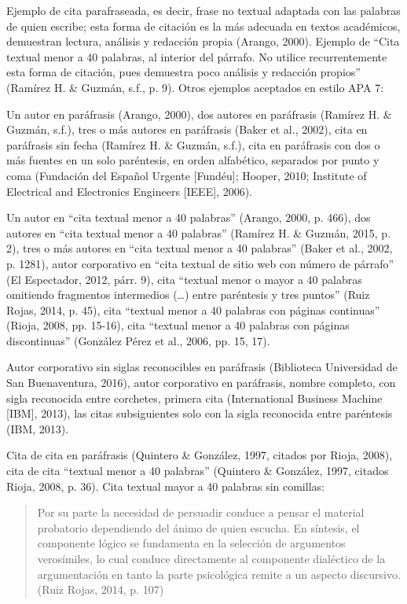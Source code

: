 Ejemplo de cita parafraseada, es decir, frase no textual adaptada con las palabras de quien escribe; esta forma de citación es la más adecuada en textos académicos, demuestran lectura, análisis y redacción propia (Arango, 2000). Ejemplo de “Cita textual menor a 40 palabras, al interior del párrafo. No utilice recurrentemente esta forma de citación, pues demuestra poco análisis y redacción propios” (Ramírez H. \& Guzmán, s.f., p. 9). Otros ejemplos aceptados en estilo APA 7:

Un autor en paráfrasis (Arango, 2000), dos autores en paráfrasis (Ramírez H. \& Guzmán, s.f.), tres o más autores en paráfrasis (Baker et al., 2002), cita en paráfrasis sin fecha (Ramírez H. \& Guzmán, s.f.), cita en paráfrasis con dos o más fuentes en un solo paréntesis, en orden alfabético, separados por punto y coma (Fundación del Español Urgente [Fundéu]; Hooper, 2010; Institute of Electrical and Electronics Engineers [IEEE], 2006).

Un autor en “cita textual menor a 40 palabras” (Arango, 2000, p. 466), dos autores en “cita textual menor a 40 palabras” (Ramírez H. \& Guzmán, 2015, p. 2), tres o más autores en “cita textual menor a 40 palabras” (Baker et al., 2002, p. 1281), autor corporativo en “cita textual de sitio web con número de párrafo” (El Espectador, 2012, párr. 9), cita “textual menor o mayor a 40 palabras omitiendo fragmentos intermedios (…) entre paréntesis y tres puntos” (Ruiz Rojas, 2014, p. 45), cita “textual menor a 40 palabras con páginas continuas” (Rioja, 2008, pp. 15-16), cita “textual menor a 40 palabras con páginas discontinuas” (González Pérez et al., 2006, pp. 15, 17).

Autor corporativo sin siglas reconocibles en paráfrasis (Biblioteca Universidad de San Buenaventura, 2016), autor corporativo en paráfrasis, nombre completo, con sigla reconocida entre corchetes, primera cita (International Business Machine [IBM], 2013), las citas subsiguientes solo con la sigla reconocida entre paréntesis (IBM, 2013).

Cita de cita en paráfrasis (Quintero \& González, 1997, citados por Rioja, 2008), cita de cita “textual menor a 40 palabras” (Quintero \& González, 1997, citados Rioja, 2008, p. 36). Cita textual mayor a 40 palabras sin comillas:

    \begin{quotation}
    Por su parte la necesidad de persuadir conduce a pensar el material probatorio dependiendo del ánimo de quien escucha. En síntesis, el componente lógico se fundamenta en la selección de argumentos verosímiles, lo cual conduce directamente al componente dialéctico de la argumentación en tanto la parte psicológica remite a un aspecto discursivo. (Ruiz Rojas, 2014, p. 107) 
    \end{quotation}

